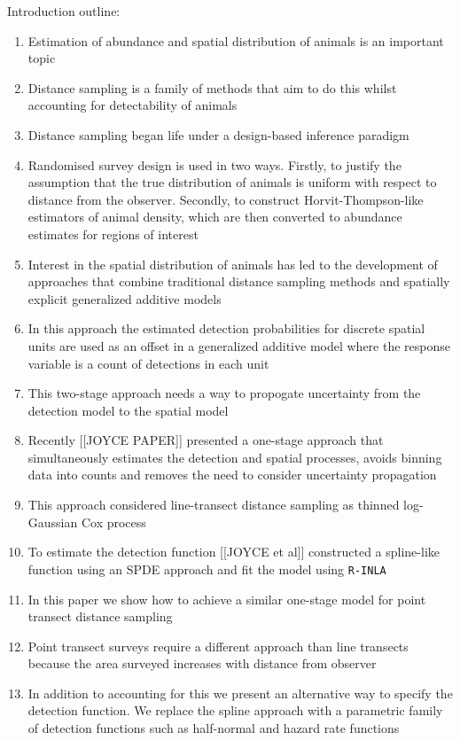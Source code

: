 \documentclass[preprint,12pt]{elsarticle}
\begin{document}
Introduction outline:
\begin{enumerate}
	\item Estimation of abundance and spatial distribution of animals is an important topic
	\item Distance sampling is a family of methods that aim to do this whilst accounting for detectability of animals
	\item Distance sampling began life under a design-based inference paradigm
	\item Randomised survey design is used in two ways.  Firstly, to justify the assumption that the true distribution of animals is uniform with respect to distance from the observer.  Secondly, to construct Horvit-Thompson-like estimators of animal density, which are then converted to abundance estimates for regions of interest
	\item Interest in the spatial distribution of animals has led to the development of approaches that combine traditional distance sampling methods and spatially explicit generalized additive models
	\item In this approach the estimated detection probabilities for discrete spatial units are used as an offset in a generalized additive model where the response variable is a count of detections in each unit
	\item This two-stage approach needs a way to propogate uncertainty from the detection model to the spatial model
	\item Recently [[JOYCE PAPER]] presented a one-stage approach that simultaneously estimates the detection and spatial processes, avoids binning data into counts and removes the need to consider uncertainty propagation
	\item This approach considered line-transect distance sampling as thinned log-Gaussian Cox process
	\item To estimate the detection function [[JOYCE et al]] constructed a spline-like function using an SPDE approach and fit the model using \texttt{R-INLA}
	\item In this paper we show how to achieve a similar one-stage model for point transect distance sampling
	\item Point transect surveys require a different approach than line transects because the area surveyed increases with distance from observer
	\item In addition to accounting for this we present an alternative way to specify the detection function.  We replace the spline approach with a parametric family of detection functions such as half-normal and hazard rate functions

\end{enumerate}
\end{document}
